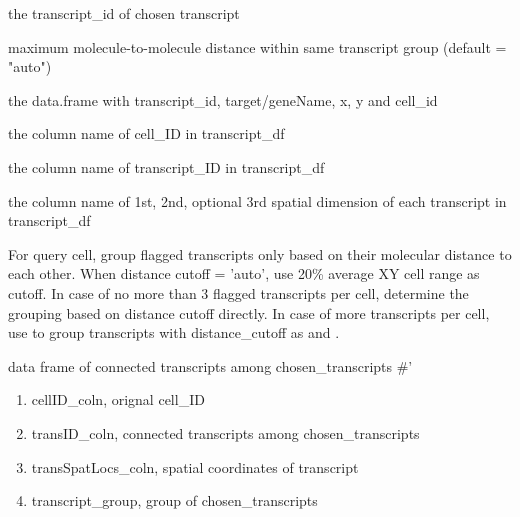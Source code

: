 \documentclass[letterpaper]{book}
\begin{document}
\begin{Arguments}
\begin{ldescription}
\item[\code{chosen\_transcripts}] the transcript\_id of chosen transcript

\item[\code{distance\_cutoff}] maximum molecule-to-molecule distance within same transcript group (default = "auto")

\item[\code{transcript\_df}] the data.frame with transcript\_id, target/geneName, x, y and cell\_id

\item[\code{cellID\_coln}] the column name of cell\_ID in transcript\_df

\item[\code{transID\_coln}] the column name of transcript\_ID in transcript\_df

\item[\code{transSpatLocs\_coln}] the column name of 1st, 2nd, optional 3rd spatial dimension of each transcript in transcript\_df
\end{ldescription}
\end{Arguments}
%
\begin{Details}
For query cell, group flagged transcripts only based on their molecular distance to each other. When distance cutoff = 'auto', use 20\% average XY cell range as cutoff. In case of no more than 3 flagged transcripts per cell, determine the grouping based on distance cutoff directly. In case of more transcripts per cell, use  to group transcripts with distance\_cutoff as  and .
\end{Details}
%
\begin{Value}
data frame of connected transcripts among chosen\_transcripts
\#' \begin{enumerate}

\item{} cellID\_coln, orignal cell\_ID
\item{} transID\_coln, connected transcripts among chosen\_transcripts
\item{} transSpatLocs\_coln, spatial coordinates of transcript
\item{} transcript\_group, group of chosen\_transcripts

\end{enumerate}

\end{Value}
\end{document}
